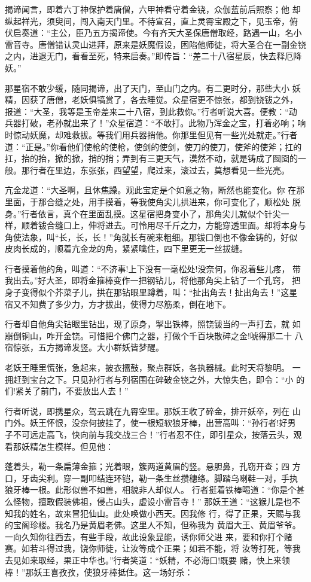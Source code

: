 揭谛闻言，即着六丁神保护着唐僧，六甲神看守着金铙，众伽蓝前后照察；他
却纵起祥光，须臾间，闯入南天门里。不待宣召，直上灵霄宝殿之下，见玉帝，俯
伏启奏道：“主公，臣乃五方揭谛使。今有齐天大圣保唐僧取经，路遇一山，名小
雷音寺。唐僧错认灵山进拜，原来是妖魔假设，困陷他师徒，将大圣合在一副金铙
之内，进退无门，看看至死，特来启奏。”即传旨：“差二十八宿星辰，快去释厄降
妖。”

那星宿不敢少缓，随同揭谛，出了天门，至山门之内。有二更时分，那些大小
妖精，因获了唐僧，老妖俱犒赏了，各去睡觉。众星宿更不惊张，都到铙钹之外，
报道：“大圣，我等是玉帝差来二十八宿，到此救你。”行者听说大喜。便教：“动
兵器打破，老孙就出来了！”众星宿道：“不敢打。此物乃浑金之宝，打着必响；响
时惊动妖魔，却难救拔。等我们用兵器捎他。你那里但见有一些光处就走。”行者
道：“正是。”你看他们使枪的使枪，使剑的使剑，使刀的使刀，使斧的使斧；扛的
扛，抬的抬，掀的掀，捎的捎；弄到有三更天气，漠然不动，就是铸成了囫囵的一
般。那行者在里边，东张张，西望望，爬过来，滚过去，莫想看见一些光亮。

亢金龙道：“大圣啊，且休焦躁。观此宝定是个如意之物，断然也能变化。你
在那里面，于那合缝之处，用手摸着，等我使角尖儿拱进来，你可变化了，顺松处
脱身。”行者依言，真个在里面乱摸。这星宿把身变小了，那角尖儿就似个针尖一
样，顺着钹合缝口上，伸将进去。可怜用尽千斤之力，方能穿透里面。却将本身与
角使法象，叫“长，长，长！”角就长有碗来粗细。那钹口倒也不像金铸的，好似
皮肉长成的，顺着亢金龙的角，紧紧噙住，四下里更无一丝拔缝。

行者摸着他的角，叫道：“不济事!上下没有一毫松处!没奈何，你忍着些儿疼，
带我出去。”好大圣，即将金箍棒变作一把钢钻儿，将他那角尖上钻了一个孔窍，
把身子变得似个芥菜子儿，拱在那钻眼里蹲着，叫：“扯出角去！扯出角去！”这星
宿又不知费了多少力，方才拔出，使得力尽筋柔，倒在地下。

行者却自他角尖钻眼里钻出，现了原身，掣出铁棒，照铙钹当的一声打去，就
如崩倒铜山，咋开金铙。可惜把个佛门之器，打做个千百块散碎之金!唬得那二十
八宿惊张，五方揭谛发竖。大小群妖皆梦醒。

老妖王睡里慌张，急起来，披衣擂鼓，聚点群妖，各执器械。此时天将黎明。
一拥赶到宝台之下。只见孙行者与列宿围在碎破金铙之外，大惊失色，即令：“小
的们!紧关了前门，不要放出人去！”

行者听说，即携星众，驾云跳在九霄空里。那妖王收了碎金，排开妖卒，列在
山门外。妖王怀恨，没奈何披挂了，使一根短软狼牙棒，出营高叫：“孙行者!好男
子不可远走高飞，快向前与我交战三合！”行者忍不住，即引星众，按落云头，观
看那妖精怎生模样。但见他：

蓬着头，勒一条扁薄金箍；光着眼，簇两道黄眉的竖。悬胆鼻，孔窃开查；四
方口，牙齿尖利。穿一副叩结连环铠，勒一条生丝攒穗绦。脚踏乌喇鞋一对，手执
狼牙棒一根。此形似兽不如兽，相貌非人却似人。
行者挺着铁棒喝道：“你是个甚么怪物，擅敢假装佛祖，侵占山头，虚设小雷音寺！”
那妖王道：“这猴儿是也不知我的姓名，故来冒犯仙山。此处唤做小西天。因我修
行，得了正果，天赐与我的宝阁珍楼。我名乃是黄眉老佛。这里人不知，但称我为
黄眉大王、黄眉爷爷。一向久知你往西去，有些手段，故此设象显能，诱你师父进
来，要和你打个赌赛。如若斗得过我，饶你师徒，让汝等成个正果；如若不能，将
汝等打死，等我去见如来取经，果正中华也。”行者笑道：“妖精，不必海口!既要
赌，快上来领棒！”那妖王喜孜孜，使狼牙棒抵住。这一场好杀：

